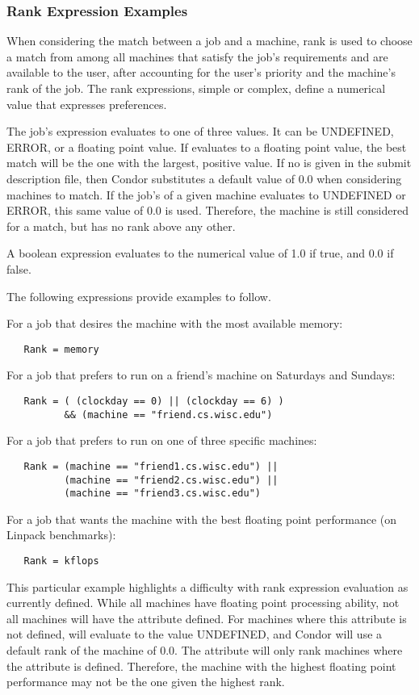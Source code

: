 \subsubsection{\label{user-man-machad}Rank Expression Examples}

When considering the match between a job and a machine, rank is used
to choose a match from among all machines that satisfy the job's
requirements and are available to the user, after accounting for
the user's priority and the machine's rank of the job.
The rank expressions, simple or complex, define a numerical value
that expresses preferences.

The job's  expression evaluates to one of three values.
It can be UNDEFINED, ERROR, or a floating point value.
If  evaluates to a floating point value,
the best match will be the one with the largest, positive value.
If no  is given 
in the submit description file,
then Condor substitutes a default value of 0.0 when considering
machines to match.
If the job's  of a given machine evaluates
to UNDEFINED or ERROR,
this same value of 0.0 is used.
Therefore, the machine is still considered for a match,
but has no rank above any other.

A boolean expression evaluates to the numerical value of 1.0
if true, and 0.0 if false.

The following  expressions provide examples to
follow.

For a job that desires the machine with the most available memory:
\begin{verbatim}
   Rank = memory
\end{verbatim}

For a job that prefers to run on a friend's machine
on Saturdays and Sundays:
\begin{verbatim}
   Rank = ( (clockday == 0) || (clockday == 6) )
          && (machine == "friend.cs.wisc.edu")
\end{verbatim}

For a job that prefers to run on one of three specific machines:
\begin{verbatim}
   Rank = (machine == "friend1.cs.wisc.edu") ||
          (machine == "friend2.cs.wisc.edu") ||
          (machine == "friend3.cs.wisc.edu")
\end{verbatim}

For a job that wants the machine with the best floating point
performance (on Linpack benchmarks):
\begin{verbatim}
   Rank = kflops
\end{verbatim}
This particular example highlights a difficulty with rank expression
evaluation as currently defined.
While all machines have floating point processing ability,
not all machines will have the  attribute defined.
For machines where this attribute is not defined,
 will evaluate to the value UNDEFINED, and
Condor will use a default rank of the machine of 0.0.
The  attribute will only rank machines where
the attribute is defined.
Therefore, the machine with the highest floating point
performance may not be the one given the highest rank.


